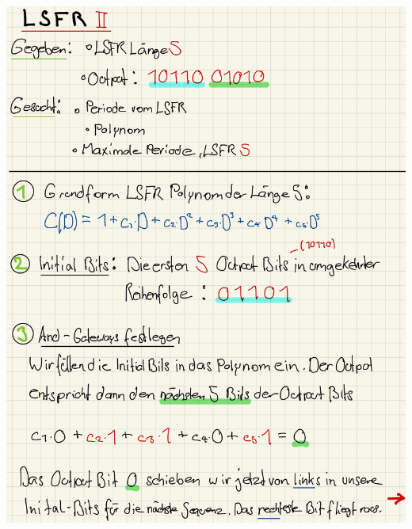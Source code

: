 \documentclass[11pt]{article}
\begin{document}
\begin{center}

	\includegraphics[scale=0.93]{img/lsfr2_1.jpg}\\
	

\end{center}
\end{document}
